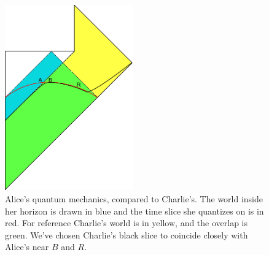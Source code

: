 \documentclass[12pt]{article}
\begin{document}
\begin{figure}
\begin{center}
\includegraphics[height=8cm]{acpic.pdf}
\end{center}
\caption{Alice's quantum mechanics, compared to Charlie's.  The world inside her horizon is drawn in blue and the time slice she quantizes on is in red.  For reference Charlie's world is in yellow, and the overlap is green.  We've chosen Charlie's black slice to coincide closely with Alice's near $B$ and $R$.}\label{alice}
\end{figure} 
\end{document}
